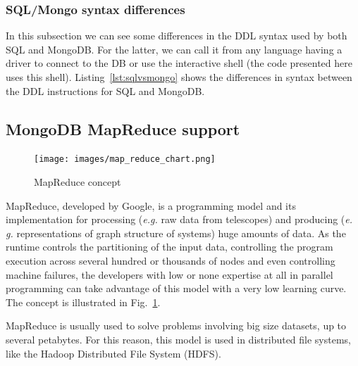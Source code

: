 

\subsubsection{SQL/Mongo syntax differences}

In this subsection we can see some differences in the DDL syntax used by both SQL and MongoDB. For the latter, we can call it from any language having a driver to connect to the DB or use the interactive shell (the code presented here uses this shell). Listing~\ref{lst:sqlvsmongo} shows the differences in syntax between the DDL instructions for SQL and MongoDB.




\subsection{MongoDB MapReduce support} %
\label{sub:mongodb_mapreduce_support}

\begin{figure}[tb]
\centering
\texttt{[image: images/map\_reduce\_chart.png]}
\caption{MapReduce concept}
\label{fig:mapreduce}
\end{figure}

MapReduce, developed by Google, is a programming model and its implementation for processing (\textit{e.g.} raw data from telescopes) and producing (\textit{e. g.} representations of graph structure of systems) huge amounts of data. As the runtime controls the partitioning of the input data, controlling the program execution across several hundred or thousands of nodes and even controlling machine failures, the developers with low or none expertise at all in parallel programming can take advantage of this model with a very low learning curve.
The concept is illustrated in Fig.~\ref{fig:mapreduce}.

MapReduce
is usually used %
to solve problems involving big size datasets, up to several petabytes. For this reason, this model is used in distributed file systems, like
the Hadoop Distributed File System (HDFS).

